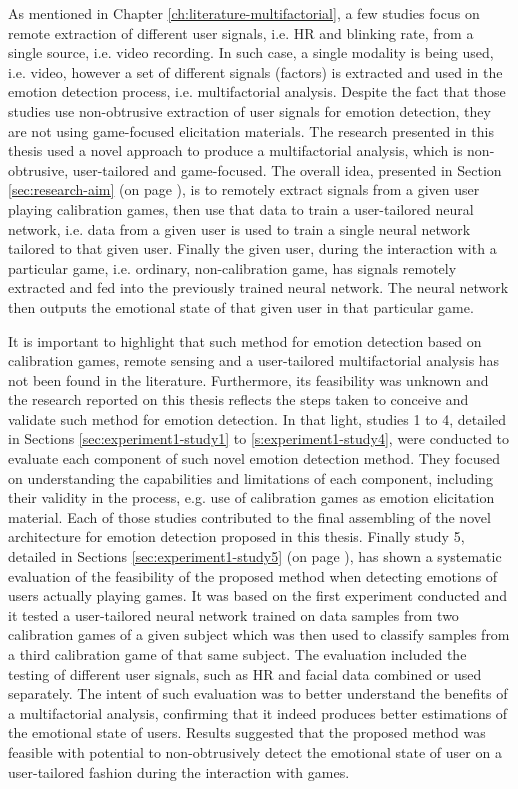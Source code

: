 As mentioned in Chapter \ref{ch:literature-multifactorial}, a few studies focus on remote extraction of different user signals, i.e. HR and blinking rate, from a single source, i.e. video recording. In such case, a single modality is being used, i.e. video, however a set of different signals (factors) is extracted and used in the emotion detection process, i.e. multifactorial analysis. Despite the fact that those studies use non-obtrusive extraction of user signals for emotion detection, they are not using game-focused elicitation materials. The research presented in this thesis used a novel approach to produce a multifactorial analysis, which is non-obtrusive, user-tailored and game-focused. The overall idea, presented in Section \ref{sec:research-aim} (on page \pageref{sec:research-aim}), is to remotely extract signals from a given user playing calibration games, then use that data to train a user-tailored neural network, i.e. data from a given user is used to train a single neural network tailored to that given user. Finally the given user, during the interaction with a particular game, i.e. ordinary, non-calibration game, has signals remotely extracted and fed into the previously trained neural network. The neural network then outputs the emotional state of that given user in that particular game.

It is important to highlight that such method for emotion detection based on calibration games, remote sensing and a user-tailored multifactorial analysis has not been found in the literature. Furthermore, its feasibility was unknown and the research reported on this thesis reflects the steps taken to conceive and validate such method for emotion detection. In that light, studies 1 to 4, detailed in Sections \ref{sec:experiment1-study1} to \ref{s:experiment1-study4}, were conducted to evaluate each component of such novel emotion detection method. They focused on understanding the capabilities and limitations of each component, including their validity in the process, e.g. use of calibration games as emotion elicitation material. Each of those studies contributed to the final assembling of the novel architecture for emotion detection proposed in this thesis. Finally study 5, detailed in Sections \ref{sec:experiment1-study5} (on page \pageref{sec:experiment1-study5}), has shown a systematic evaluation of the feasibility of the proposed method when detecting emotions of users actually playing games. It was based on the first experiment conducted and it tested a user-tailored neural network trained on data samples from two calibration games of a given subject which was then used to classify samples from a third calibration game of that same subject. The evaluation included the testing of different user signals, such as HR and facial data combined or used separately. The intent of such evaluation was to better understand the benefits of a multifactorial analysis, confirming that it indeed produces better estimations of the emotional state of users. Results suggested that the proposed method was feasible with potential to non-obtrusively detect the emotional state of user on a user-tailored fashion during the interaction with games.

